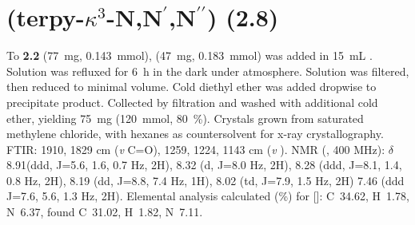 \section{(terpy-$\kappa^3$-N,N$^\prime$,N$^{\prime \prime}$) (2.8)}\label{sec.c8}
To \textbf{2.2} (77~mg,  0.143~mmol),  (47~mg,  0.183~mmol) was added in 15~mL . Solution was refluxed for 6~h in the dark under  atmosphere. Solution was filtered, then reduced to minimal volume. Cold diethyl ether was added dropwise to precipitate product. Collected by filtration and washed with additional cold ether, yielding 75~mg (120~mmol, 80~\%).  Crystals grown from saturated methylene chloride, with hexanes as countersolvent for x-ray crystallography. FTIR: 1910, 1829 cm (\textit{v} C=O), 1259, 1224, 1143 cm (\textit{v} ).  NMR (, 400 MHz): $\delta$ 8.91(ddd, J=5.6, 1.6, 0.7 Hz, 2H), 8.32 (d, J=8.0 Hz, 2H), 8.28 (ddd, J=8.1, 1.4, 0.8 Hz, 2H), 8.19 (dd, J=8.8, 7.4 Hz, 1H), 8.02 (td, J=7.9, 1.5 Hz, 2H) 7.46 (ddd J=7.6, 5.6, 1.3 Hz, 2H).  Elemental analysis calculated (\%) for []: C~34.62, H~1.78, N~6.37, found C~31.02, H~1.82, N~7.11.


